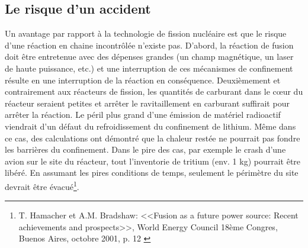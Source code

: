 \documentclass[12pt,a4paper]{article}
\begin{document}
\subsection{Le risque d'un accident}
Un avantage par rapport à la technologie de fission nucléaire est que le risque d'une réaction en chaine incontrôlée n'existe pas. D'abord, la réaction de fusion doit être entretenue avec des dépenses grandes (un champ magnétique, un laser de haute puissance, etc.) et une interruption de ces mécanismes de confinement résulte en une interruption de la réaction en conséquence. Deuxièmement et contrairement aux réacteurs de fission, les quantités de carburant dans le cœur du réacteur seraient petites et arrêter le ravitaillement en carburant suffirait pour arrêter la réaction. Le péril plus grand d'une émission de matériel radioactif viendrait d'un défaut du refroidissement du confinement de lithium. Même dans ce cas, des calculations ont démontré que la chaleur restée ne pourrait pas fondre les barrières du confinement. Dans le pire des cas, par exemple le crash d'une avion sur le site du réacteur, tout l'inventorie de tritium (env. 1 kg) pourrait être libéré. En assumant les pires conditions de temps, seulement le périmètre du site devrait être évacué\footnote{T. Hamacher et A.M. Bradshaw: <<Fusion as a future power source: Recent achievements and prospects>>, World Energy Council 18ème Congres, Buenos Aires, octobre 2001, p. 12 \cite{hamacher}}.
\end{document}
